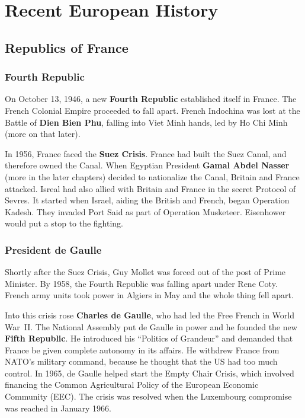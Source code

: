 \chapter{Recent European History}

\section{Republics of France}

\subsection*{Fourth Republic}

On October 13, 1946, a new \textbf{Fourth Republic} established itself in France.
The French Colonial Empire proceeded to fall apart.
French Indochina was lost at the Battle of \textbf{Dien Bien Phu},
falling into Viet Minh hands, led by Ho Chi Minh (more on that later).

In 1956, France faced the \textbf{Suez Crisis}.
France had built the Suez Canal, and therefore owned the Canal.
When Egyptian President \textbf{Gamal Abdel Nasser} (more in the later chapters)
decided to nationalize the Canal, Britain and France attacked.
Isreal had also allied with Britain and France in the secret Protocol of Sevres.
It started when Israel, aiding the British and French, began Operation Kadesh.
They invaded Port Said as part of Operation Musketeer.
Eisenhower would put a stop to the fighting.

\subsection*{President de Gaulle}

Shortly after the Suez Crisis, Guy Mollet was forced out of the post of Prime Minister.
By 1958, the Fourth Republic was falling apart under Rene Coty.
French army units took power in Algiers in May and the whole thing fell apart.

Into this crisis rose \textbf{Charles de Gaulle}, who had led the Free French in World War~II\@.
The National Assembly put de Gaulle in power and he founded the new \textbf{Fifth Republic}.
He introduced his ``Politics of Grandeur'' and demanded that France be given complete autonomy in its affairs.
He withdrew France from NATO's military command, because he thought that the US had too much control.
In 1965, de Gaulle helped start the Empty Chair Crisis,
which involved financing the Common Agricultural Policy of the European Economic Community (EEC).
The crisis was resolved when the Luxembourg compromise was reached in January 1966.

